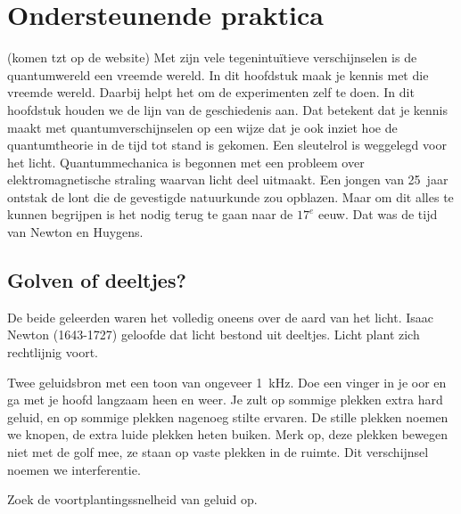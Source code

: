 \documentclass[../main.tex]{subfiles}
\begin{document}
\onlyinsubfile{
\setcounter{chapter}{0}
}
\notinsubfile{}
\chapter{Ondersteunende praktica}\label{chap:H1}
(komen tzt op de website)
Met zijn vele tegenintu\"itieve verschijnselen is de quantumwereld een vreemde wereld. In dit hoofdstuk maak je kennis met die vreemde wereld. Daarbij helpt het om de experimenten zelf te doen. In dit hoofdstuk houden we de lijn van de geschiedenis aan. Dat betekent dat je kennis maakt met quantumverschijnselen op een wijze dat je ook inziet hoe de quantumtheorie in de tijd tot stand is gekomen. 
Een sleutelrol is weggelegd voor het licht. Quantummechanica is begonnen met een probleem over elektromagnetische straling waarvan licht deel uitmaakt. Een jongen van \num{25}~jaar ontstak de lont die de gevestigde natuurkunde zou opblazen. Maar om dit alles te kunnen begrijpen is het nodig terug te gaan naar de $17^e$ eeuw. Dat was de tijd van Newton en Huygens. 



\section{Golven of deeltjes?}
De beide geleerden waren het volledig oneens over de aard van het licht. Isaac Newton (1643-1727) geloofde dat licht bestond uit deeltjes. Licht plant zich rechtlijnig voort.

\begin{experiment}[blue]{}
Twee geluidsbron met een toon van ongeveer \SI{1}{\kilo\hertz}. Doe een vinger in je oor en ga met je hoofd langzaam heen en weer. Je zult op sommige plekken extra hard geluid, en op sommige plekken nagenoeg stilte ervaren. De stille plekken noemen we knopen, de extra luide plekken heten buiken. Merk op, deze plekken bewegen niet met de golf mee, ze staan op vaste plekken in de ruimte. Dit verschijnsel noemen we interferentie.

Zoek de voortplantingssnelheid van geluid op.
\end{experiment}
\end{document}
